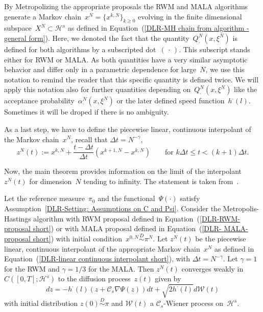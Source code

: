 By Metropolizing the appropriate proposals the RWM and MALA algorithms generate a Markov chain~$x^{N} = \{ x^{k,N} \}_{k \geq 0}$ evolving in the finite dimensional subspace~$X^{N} \subset \mathcal{H}^s$ as defined in Equation~(\ref{DLR-MH chain from algorithm - general form}). Here, we denoted the fact that the quantity~$Q^N_{\cdot}(x, \xi^N)$ is defined for both algorithms by a subscripted dot~$(\,\cdot\,)$. This subscript stands either for RWM or MALA. As both quantities have a very similar asymptotic behavior and differ  only in a parametric dependence for large~$N$, we use this notation to remind the reader that this specific quantity is defined twice. We will apply this notation also for further quantities depending on~$Q^N_{\cdot}(x, \xi^N)$ like the acceptance probability~$\alpha^{N}_{\cdot} (x, \xi^{N})$ or the later defined speed function~$h^{\cdot}(l)$. Sometimes it will be droped if there is no ambiguity.

As a last step, we have to define the piecewise linear, continuous interpolant of the Markov chain~$x^N$, recall that $\Delta t = N^{-\gamma}$,
\begin{equation}
 \label{DLR-linear continuous interpolant short}
 z^N (t) := x^{k,N} + \frac{t - \Delta t}{\Delta t} (x^{k+1,N} - x^{k,N}) \qquad \text{for } k \Delta t \leq t < ( k + 1) \Delta t.
\end{equation}

Now, the main theorem provides information on the limit of the interpolant~$z^N(t)$ for dimension~$N$ tending to infinity. The statement is taken from~\autocite[Main Theorem, Theorem 2.6]{Mattingly2010, Pillai2012}.
\begin{thm}
 \label{DLR-THM main theorem}
 Let the reference measure~$\pi_0$ and the functional~$\Psi(\cdot)$ satisfy Assumption~\ref{DLR-Setting: Assumptions on C and Psi}. Consider the Metropolis-Hastings algorithm with RWM proposal defined in Equation~(\ref{DLR-RWM-proposal short}) or with MALA proposal defined in Equation~(\ref{DLR- MALA-proposal short}) with initial condition~$x^{0,N} \stackrel{D}{\sim} \pi^N$. Let $z^N(t)$ be the piecewise linear, continuous interpolant of the appropriate Markov chain~$x^N$ as defined in Equation~(\ref{DLR-linear continuous interpolant short}), with $\Delta t = N^{- \gamma}$. Let $\gamma=1$ for the RWM and $\gamma=1/3$ for the MALA. Then $z^N(t)$ converges weakly in $C([0,T];\mathcal{H}^s)$ to the diffusion process~$z(t)$ given by
 \begin{equation}
 \label{DLR-Thm diffusion process}
  dz = -h^{\cdot}(l) (z + \mathcal{C}_s \nabla \Psi(z)) dt + \sqrt{2 h^{\cdot}(l)} d\mathcal{W}(t)
 \end{equation}
with initial distribution $z(0)\stackrel{D}{\sim} \pi$ and $\mathcal{W}(t)$ a $\mathcal{C}_s$-Wiener process on~$\mathcal{H}^s$.
\end{thm}

